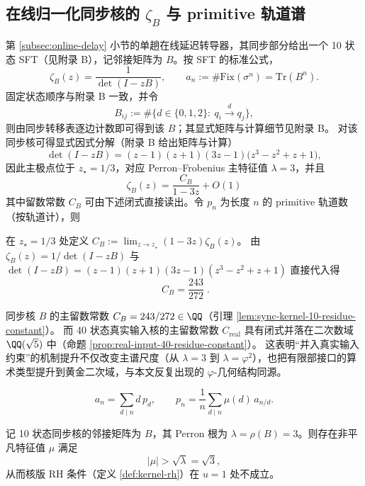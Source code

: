 \subsection{在线归一化同步核的 \texorpdfstring{$\zeta_B$}{zeta\_B} 与 primitive 轨道谱}\label{subsec:zeta-online-kernel}
第 \ref{subsec:online-delay} 小节的单趟在线延迟转导器，其同步部分给出一个 10 状态 SFT（见附录 B），记邻接矩阵为 $B$。按 SFT 的标准公式，
\[
\zeta_B(z)=\frac{1}{\det(I-zB)},\qquad
a_n:=\#\mathrm{Fix}(\sigma^n)=\mathrm{Tr}(B^n).
\]
固定状态顺序与附录 B 一致，并令
\[
B_{ij}:=\#\{d\in\{0,1,2\}:\ q_i\xrightarrow{d}q_j\},
\]
则由同步转移表逐边计数即可得到该 $B$；其显式矩阵与计算细节见附录 B。
对该同步核可得显式因式分解（附录 B 给出矩阵与计算）
\[
\det(I-zB)=(z-1)(z+1)(3z-1)\bigl(z^3-z^2+z+1\bigr),
\]
因此主极点位于 $z_\star=1/3$，对应 Perron--Frobenius 主特征值 $\lambda=3$，并且
\[
\zeta_B(z)=\frac{C_B}{1-3z}+O(1)
\]
其中留数常数 \(C_B\) 可由下述闭式直接读出。令 $p_n$ 为长度 $n$ 的 primitive 轨道数（按轨道计），则

\begin{remark}[10 状态同步核的主极点留数常数]\label{lem:sync-kernel-10-residue-constant}
在 \(z_\star=1/3\) 处定义
\(
C_B:=\lim_{z\to z_\star}(1-3z)\zeta_B(z)
\)。
由 \(\zeta_B(z)=1/\det(I-zB)\) 与
\(
\det(I-zB)=(z-1)(z+1)(3z-1)(z^3-z^2+z+1)
\)
直接代入得
\[
\boxed{\; C_B=\frac{243}{272}\; }.
\]
\end{remark}

\begin{remark}\label{rem:residue-field-sync-vs-real}
同步核 \(B\) 的主留数常数 \(C_B=243/272\in\QQ\)（引理 \ref{lem:sync-kernel-10-residue-constant}）。
而 40 状态真实输入核的主留数常数 \(C_{\mathrm{real}}\) 具有闭式并落在二次数域 \(\QQ(\sqrt5)\) 中（命题 \ref{prop:real-input-40-residue-constant}）。
这表明“并入真实输入约束”的机制提升不仅改变主谱尺度（从 \(\lambda=3\) 到 \(\lambda=\varphi^2\)），也把有限部接口的算术类型提升到黄金二次域，与本文反复出现的 \(\varphi\)-几何结构同源。
\end{remark}
\[
a_n=\sum_{d\mid n} d\,p_d,
\qquad
p_n=\frac{1}{n}\sum_{d\mid n}\mu(d)\,a_{n/d}.
\]

\begin{remark}[10 状态同步核不满足核版 RH（\texorpdfstring{$u=1$}{u=1}）]\label{prop:sync-kernel-10-nonrh}
记 10 状态同步核的邻接矩阵为 $B$，其 Perron 根为 $\lambda=\rho(B)=3$。则存在非平凡特征值 $\mu$ 满足
\[
|\mu|>\sqrt{\lambda}=\sqrt{3},
\]
从而核版 RH 条件（定义 \ref{def:kernel-rh}）在 $u=1$ 处不成立。
\end{remark}

